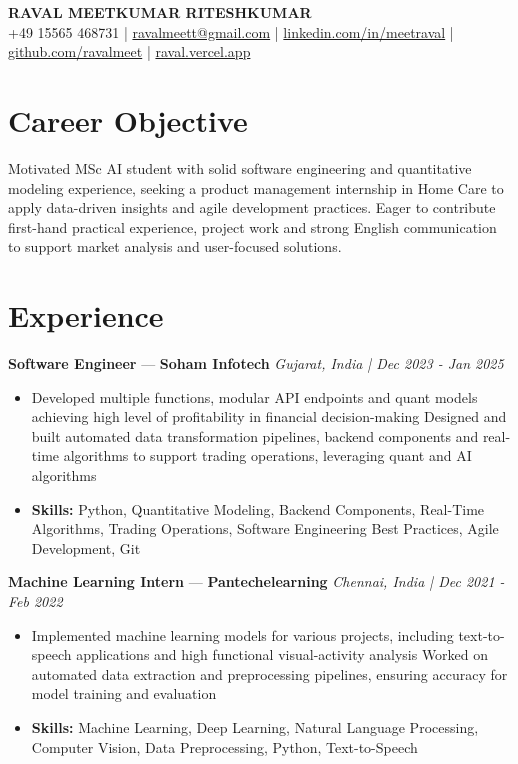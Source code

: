 \documentclass[a4paper,10pt]{article}
\begin{document}
\begin{center}
  {\Large\bfseries RAVAL MEETKUMAR RITESHKUMAR}\\[2pt]
  {\small +49 15565 468731 \;|\; \href{mailto:ravalmeett@gmail.com}{ravalmeett@gmail.com} \;|\; \href{https://www.linkedin.com/in/meetraval/}{linkedin.com/in/meetraval} \;|\; \href{https://github.com/ravalmeet}{github.com/ravalmeet} \;|\; \href{https://raval.vercel.app/}{raval.vercel.app}}
\end{center}
\vspace{-3pt}

\section*{Career Objective}
Motivated MSc AI student with solid software engineering and quantitative modeling experience, seeking a product management internship in Home Care to apply data-driven insights and agile development practices. Eager to contribute first-hand practical experience, project work and strong English communication to support market analysis and user-focused solutions.\par

\section*{Experience}
\textbf{Software Engineer} — \textbf{Soham Infotech} \hfill \textit{Gujarat, India \;|\; Dec 2023 - Jan 2025}\par
\vspace{1pt}
\begin{itemize}
  \item Developed multiple functions, modular API endpoints and quant models achieving high level of profitability in financial decision-making Designed and built automated data transformation pipelines, backend components and real-time algorithms to support trading operations, leveraging quant and AI algorithms
  \item \textbf{Skills:} Python, Quantitative Modeling, Backend Components, Real-Time Algorithms, Trading Operations, Software Engineering Best Practices, Agile Development, Git
\end{itemize}
\vspace{3pt}
\textbf{Machine Learning Intern} — \textbf{Pantechelearning} \hfill \textit{Chennai, India \;|\; Dec 2021 - Feb 2022}\par
\vspace{1pt}
\begin{itemize}
  \item Implemented machine learning models for various projects, including text-to-speech applications and high functional visual-activity analysis Worked on automated data extraction and preprocessing pipelines, ensuring accuracy for model training and evaluation
  \item \textbf{Skills:} Machine Learning, Deep Learning, Natural Language Processing, Computer Vision, Data Preprocessing, Python, Text-to-Speech
\end{itemize}
\end{document}

